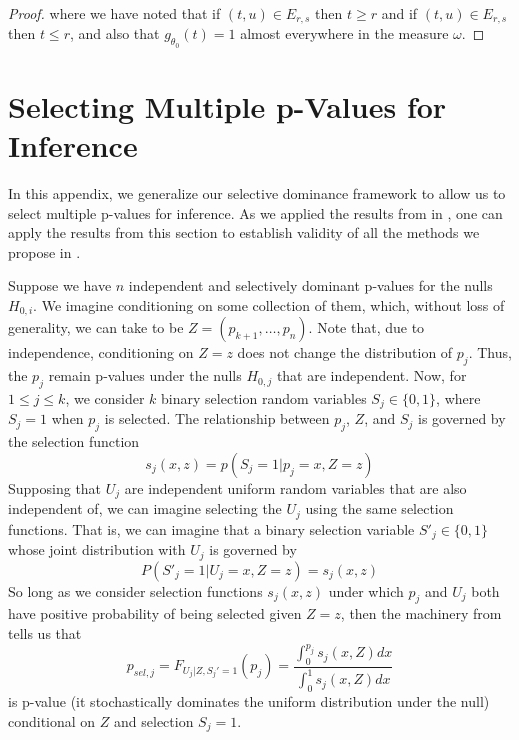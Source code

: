 \documentclass{article}
\begin{document}
\begin{appendix}
\begin{proof}
    where we have noted that if $(t, u) \in E_{r, s}$ then $t \geq r$ and if $(t, u) \in E_{r, s}$ then $t \leq r$, and also that $g_{\theta_0}(t) = 1$ almost everywhere in the measure $\omega$.  
\end{proof}

\section{Selecting Multiple p-Values for Inference}
\label{sec:multiple_p_vals_appdx}

In this appendix, we generalize our selective dominance framework to allow us to select multiple p-values for inference. As we applied the results from  in , one can apply the results from this section to establish validity of all the methods we propose in . 

Suppose we have $n$ independent and selectively dominant p-values for the nulls $H_{0, i}$. We imagine conditioning on some collection of them, which, without loss of generality, we can take to be $Z = (p_{k+1}, \dots, p_n)$. Note that, due to independence, conditioning on $Z = z$ does not change the distribution of $p_j$. Thus, the $p_j$ remain p-values under the nulls $H_{0, j}$ that are independent. Now, for $1 \leq j \leq k$, we consider $k$ binary selection random variables $S_j \in \{0, 1\}$, where $S_j = 1$ when $p_j$ is selected. The relationship between $p_j$, $Z$, and $S_j$ is governed by the selection function 
\begin{equation*}
    s_j(x, z) = p(S_j = 1 | p_j = x, Z=z)
\end{equation*} 
Supposing that $U_j$ are independent uniform random variables that are also independent of, we can imagine selecting the $U_j$ using the same selection functions. That is, we can imagine that a binary selection variable $S'_j \in \{0, 1\}$ whose joint distribution with $U_j$ is governed by 
\begin{equation*}
    P(S'_j = 1| U_j = x, Z = z) = s_j(x, z)
\end{equation*}
So long as we consider selection functions $s_j(x, z)$ under which $p_j$ and $U_j$ both have positive probability of being selected given $Z=z$, then the machinery from  tells us that 
\begin{equation*}
    p_{sel, j} = F_{U_j |Z, S_j' = 1}(p_j) = \frac{\int_0^{p_j} s_j(x, Z)dx }{\int_0^1 s_j(x, Z)dx}
\end{equation*}
is p-value (it stochastically dominates the uniform distribution under the null) conditional on $Z$ and selection $S_j = 1$. 


\end{appendix}
\end{document}

